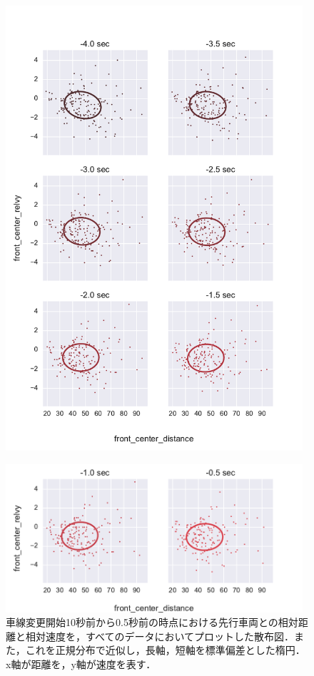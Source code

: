 \begin{figure}[p]
  \centering
    \includegraphics[width=11cm,keepaspectratio]{fig/scatter_ellipse_front_center_distance_front_center_relvy2.pdf}
\end{figure}
\begin{figure}[t]
  \centering
    \includegraphics[width=11cm,keepaspectratio]{fig/scatter_ellipse_front_center_distance_front_center_relvy3.pdf}
  \caption{車線変更開始10秒前から0.5秒前の時点における先行車両との相対距離と相対速度を，すべてのデータにおいてプロットした散布図．また，これを正規分布で近似し，長軸，短軸を標準偏差とした楕円．x軸が距離を，y軸が速度を表す．}
  \label{fig:scatter_ellipse}
\end{figure}
